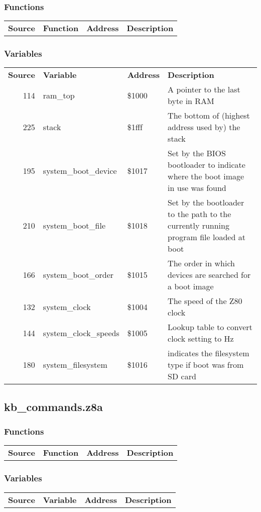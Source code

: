 \subsubsection{Functions}
\begin{tabular}{rllp{7cm}}
 \textbf{Source}&\textbf{Function}&\textbf{Address}&\textbf{Description}\\
\end{tabular}

\subsubsection{Variables}
\begin{tabular}{rllp{7cm}}
 \textbf{Source}&\textbf{Variable}&\textbf{Address}&\textbf{Description}\\
 114&ram\_top&\$1000&A pointer to the last byte in RAM\\
 225&stack&\$1fff&The bottom of (highest address used by) the stack\\
 195&system\_boot\_device&\$1017&Set by the BIOS bootloader to indicate where the boot image in use was found\\
 210&system\_boot\_file&\$1018&Set by the bootloader to the path to the currently running program file loaded at boot\\
 166&system\_boot\_order&\$1015&The order in which devices are searched for a boot image\\
 132&system\_clock&\$1004&The speed of the Z80 clock\\
 144&system\_clock\_speeds&\$1005&Lookup table to convert clock setting to Hz\\
 180&system\_filesystem&\$1016&indicates the filesystem type if boot was from SD card\\
\end{tabular}

\subsection{kb\_commands.z8a}
\subsubsection{Functions}
\begin{tabular}{rllp{7cm}}
 \textbf{Source}&\textbf{Function}&\textbf{Address}&\textbf{Description}\\
\end{tabular}

\subsubsection{Variables}
\begin{tabular}{rllp{7cm}}
 \textbf{Source}&\textbf{Variable}&\textbf{Address}&\textbf{Description}\\
\end{tabular}


